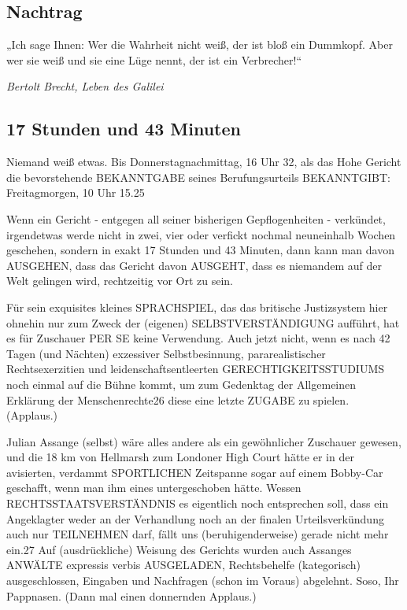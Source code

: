 \begin{multicols}{2}

\chapter{Nachtrag}

\epigraph{„Ich sage Ihnen: Wer die Wahrheit nicht weiß, der ist bloß ein Dummkopf. Aber wer sie weiß und sie eine Lüge nennt, der ist ein Verbrecher!“}{\textit{Bertolt Brecht, Leben des Galilei}}


\section{17 Stunden und 43 Minuten}

Niemand weiß etwas. Bis Donnerstagnachmittag, 16 Uhr
32, als das Hohe Gericht die bevorstehende BEKANNTGABE seines Berufungsurteils BEKANNTGIBT: Freitagmorgen, 10 Uhr 15.25

Wenn ein Gericht - entgegen all seiner bisherigen Gepflogenheiten - verkündet, irgendetwas werde nicht in
zwei, vier oder verfickt nochmal neuneinhalb Wochen
geschehen, sondern in exakt 17 Stunden und 43 Minuten, dann kann man davon AUSGEHEN, dass das Gericht davon AUSGEHT, dass es niemandem auf der Welt
gelingen wird, rechtzeitig vor Ort zu sein.

Für sein exquisites kleines SPRACHSPIEL, das das britische Justizsystem hier ohnehin nur zum Zweck der
(eigenen) SELBSTVERSTÄNDIGUNG aufführt, hat es für
Zuschauer PER SE keine Verwendung. Auch jetzt nicht,
wenn es nach 42 Tagen (und Nächten) exzessiver Selbstbesinnung, pararealistischer Rechtsexerzitien und leidenschaftsentleerten
GERECHTIGKEITSSTUDIUMS
noch einmal auf die Bühne kommt, um zum Gedenktag
der Allgemeinen Erklärung der Menschenrechte26 diese
eine letzte ZUGABE zu spielen. (Applaus.)

Julian Assange (selbst) wäre alles andere als ein gewöhnlicher Zuschauer gewesen, und die 18 km von Hellmarsh
zum Londoner High Court hätte er in der avisierten, verdammt SPORTLICHEN Zeitspanne sogar auf einem Bobby-Car geschafft, wenn man ihm eines untergeschoben
hätte. Wessen RECHTSSTAATSVERSTÄNDNIS es eigentlich noch entsprechen soll, dass ein Angeklagter weder
an der Verhandlung noch an der finalen Urteilsverkündung auch nur TEILNEHMEN darf, fällt uns (beruhigenderweise) gerade nicht mehr ein.27 Auf (ausdrückliche)
Weisung des Gerichts wurden auch Assanges ANWÄLTE
expressis verbis AUSGELADEN, Rechtsbehelfe (kategorisch) ausgeschlossen, Eingaben und Nachfragen (schon
im Voraus) abgelehnt. Soso, Ihr Pappnasen. (Dann mal
einen donnernden Applaus.)


\end{multicols}
